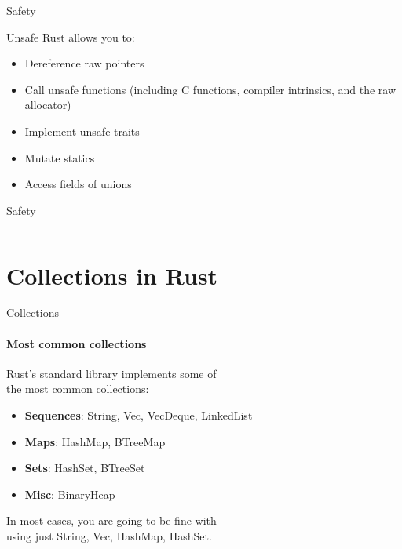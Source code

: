 \documentclass[usenames,dvipsnames,10pt,aspectratio=169]{beamer}
\begin{document}
\begin{frame}{Safety}
	
\large
Unsafe Rust allows you to:

\begin{itemize}[label=$\bullet$]
	\item Dereference raw pointers
	\item Call unsafe functions (including C functions, compiler intrinsics, and the raw allocator)
	\item Implement unsafe traits
	\item Mutate statics
	\item Access fields of unions
\end{itemize}

\end{frame}

\begin{frame}{Safety}
\vspace{0.3cm}
	\inputminted[fontsize=\large]{rust}{code/safety.rs}
\end{frame}


\section{Collections in Rust}

\begin{frame}{Collections}
	\framesubtitle{Most common collections}
	\large
	Rust's standard library implements some of\\
	the most common collections:
\begin{itemize}[label=$\bullet$]
	\item \textbf{Sequences}: \textcolor{ucuyellow}{String}, 
	\textcolor{ucuyellow}{Vec}, 
		\textcolor{ucuyellow}{VecDeque}, \textcolor{ucuyellow}{LinkedList}
	\item \textbf{Maps}: \textcolor{ucuyellow}{HashMap}, \textcolor{ucuyellow}{BTreeMap}
	\item \textbf{Sets}: \textcolor{ucuyellow}{HashSet}, \textcolor{ucuyellow}{BTreeSet}
	\item \textbf{Misc}: \textcolor{ucuyellow}{BinaryHeap}
\end{itemize}

	\vspace{0.4cm}
	In most cases, you are going to be fine with\\
	using just \textcolor{ucuyellow}{String}, \textcolor{ucuyellow}{Vec}, 
	\textcolor{ucuyellow}{HashMap}, \textcolor{ucuyellow}{HashSet}.
\end{frame}
\end{document}

